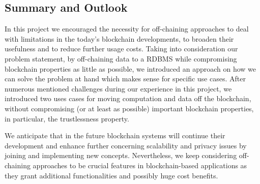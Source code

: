 \subsection{Summary and Outlook}
In this project we encouraged the necessity for off-chaining approaches to deal with limitations in the today’s blockchain developments, to broaden their usefulness and to reduce further usage costs. Taking into consideration our problem statement, by off-chaining data to a RDBMS while compromising blockchain properties as little as possible, we introduced an approach on how we can solve the problem at hand which makes sense for specific use cases. After numerous mentioned challenges during our experience in this project, we introduced two uses cases for moving computation and data off the blockchain, without compromising (or at least as possible) important blockchain properties, in particular, the trustlessness property.

We anticipate that in the future blockchain systems will continue their development and enhance further concerning scalability and privacy issues by joining and implementing new concepts. Nevertheless, we keep considering off-chaining approaches to be crucial features in blockchain-based applications as they grant additional functionalities and possibly huge cost benefits.
